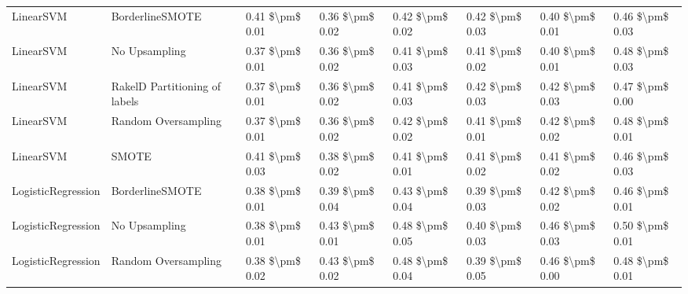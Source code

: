 \begin{tabular}{llllllll}
                      LinearSVM &               BorderlineSMOTE & 0.41 \$\textbackslash pm\$ 0.01 &           0.36 \$\textbackslash pm\$ 0.02 &       0.42 \$\textbackslash pm\$ 0.02 &        0.42 \$\textbackslash pm\$ 0.03 &                         0.40 \$\textbackslash pm\$ 0.01 &     0.46 \$\textbackslash pm\$ 0.03 \\
                      LinearSVM &                 No Upsampling & 0.37 \$\textbackslash pm\$ 0.01 &           0.36 \$\textbackslash pm\$ 0.02 &       0.41 \$\textbackslash pm\$ 0.03 &        0.41 \$\textbackslash pm\$ 0.02 &                         0.40 \$\textbackslash pm\$ 0.01 &     0.48 \$\textbackslash pm\$ 0.03 \\
                      LinearSVM & RakelD Partitioning of labels & 0.37 \$\textbackslash pm\$ 0.01 &           0.36 \$\textbackslash pm\$ 0.02 &       0.41 \$\textbackslash pm\$ 0.03 &        0.42 \$\textbackslash pm\$ 0.03 &                         0.42 \$\textbackslash pm\$ 0.03 &     0.47 \$\textbackslash pm\$ 0.00 \\
                      LinearSVM &           Random Oversampling & 0.37 \$\textbackslash pm\$ 0.01 &           0.36 \$\textbackslash pm\$ 0.02 &       0.42 \$\textbackslash pm\$ 0.02 &        0.41 \$\textbackslash pm\$ 0.01 &                         0.42 \$\textbackslash pm\$ 0.02 &     0.48 \$\textbackslash pm\$ 0.01 \\
                      LinearSVM &                         SMOTE & 0.41 \$\textbackslash pm\$ 0.03 &           0.38 \$\textbackslash pm\$ 0.02 &       0.41 \$\textbackslash pm\$ 0.01 &        0.41 \$\textbackslash pm\$ 0.02 &                         0.41 \$\textbackslash pm\$ 0.02 &     0.46 \$\textbackslash pm\$ 0.03 \\
             LogisticRegression &               BorderlineSMOTE & 0.38 \$\textbackslash pm\$ 0.01 &           0.39 \$\textbackslash pm\$ 0.04 &       0.43 \$\textbackslash pm\$ 0.04 &        0.39 \$\textbackslash pm\$ 0.03 &                         0.42 \$\textbackslash pm\$ 0.02 &     0.46 \$\textbackslash pm\$ 0.01 \\
             LogisticRegression &                 No Upsampling & 0.38 \$\textbackslash pm\$ 0.01 &           0.43 \$\textbackslash pm\$ 0.01 &       0.48 \$\textbackslash pm\$ 0.05 &        0.40 \$\textbackslash pm\$ 0.03 &                         0.46 \$\textbackslash pm\$ 0.03 &     0.50 \$\textbackslash pm\$ 0.01 \\
             LogisticRegression &           Random Oversampling & 0.38 \$\textbackslash pm\$ 0.02 &           0.43 \$\textbackslash pm\$ 0.02 &       0.48 \$\textbackslash pm\$ 0.04 &        0.39 \$\textbackslash pm\$ 0.05 &                         0.46 \$\textbackslash pm\$ 0.00 &     0.48 \$\textbackslash pm\$ 0.01 \\

\end{tabular}

